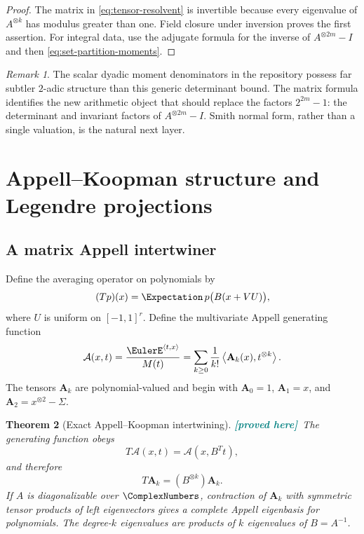 \documentclass[11pt,oneside]{article}
\newtheorem{theorem}{Theorem}[section]
\theoremstyle{definition}
\theoremstyle{remark}
\newtheorem{remark}[theorem]{Remark}
\newcommand{\ip}[2]{\left\langle #1,#2\right\rangle}
\newcommand{\New}{\textcolor{teal}{\textbf{[proved here]}}}
\begin{document}
\begin{proof}
The matrix in \eqref{eq:tensor-resolvent} is invertible because every eigenvalue
of $A^{\otimes k}$ has modulus greater than one.  Field closure under inversion
proves the first assertion.  For integral data, use the adjugate formula for the
inverse of $A^{\otimes 2m}-I$ and then \eqref{eq:set-partition-moments}.
\end{proof}

\begin{remark}
The scalar dyadic moment denominators in the repository possess far subtler
$2$-adic structure than this generic determinant bound.  The matrix formula
identifies the new arithmetic object that should replace the factors
$2^{2m}-1$: the determinant and invariant factors of $A^{\otimes 2m}-I$.
Smith normal form, rather than a single valuation, is the natural next layer.
\end{remark}

\section{Appell--Koopman structure and Legendre projections}
\label{sec:appell-legendre}

\subsection{A matrix Appell intertwiner}

Define the averaging operator on polynomials by
\begin{equation}
 (Tp)(x)=\Expectation\,p\bigl(B(x+VU)\bigr),
 \label{eq:transfer-operator}
\end{equation}
where $U$ is uniform on $[-1,1]^r$.  Define the multivariate Appell generating
function
\begin{equation}
 \mathcal A(x,t)=\frac{\EulerE^{\ip{t}{x}}}{M(t)}
 =\sum_{k\ge0}\frac1{k!}
  \ip{\mathbf A_k(x)}{t^{\otimes k}}.
 \label{eq:appell-generating}
\end{equation}
The tensors $\mathbf A_k$ are polynomial-valued and begin with
$\mathbf A_0=1$, $\mathbf A_1=x$, and
$\mathbf A_2=x^{\otimes2}-\Sigma$.

\begin{theorem}[Exact Appell--Koopman intertwining]
\label{thm:appell}
\New\ The generating function obeys
\begin{equation}
 T\mathcal A(x,t)=\mathcal A(x,B^Tt),
 \label{eq:appell-intertwine}
\end{equation}
and therefore
\begin{equation}
 T\mathbf A_k=(B^{\otimes k})\mathbf A_k.
 \label{eq:appell-tensor-action}
\end{equation}
If $A$ is diagonalizable over $\ComplexNumbers$, contraction of $\mathbf A_k$ with symmetric
tensor products of left eigenvectors gives a complete Appell eigenbasis for
polynomials.  The degree-$k$ eigenvalues are products of $k$ eigenvalues of
$B=A^{-1}$.
\end{theorem}
\end{document}
